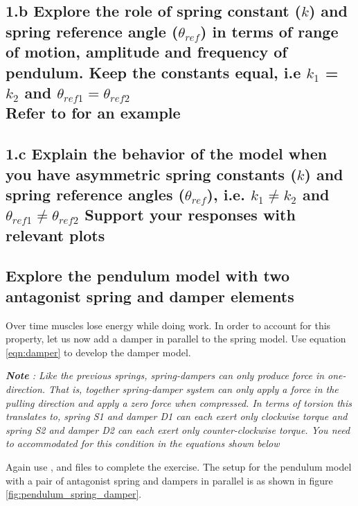 \documentclass{cmc}
\begin{document}
\subsection*{1.b Explore the role of spring constant ($k$) and spring
  reference angle ($\theta_{ref}$) in terms of range of motion,
  amplitude and frequency of pendulum. Keep the constants equal, i.e
  $k_1$  = $k_2$ and $\theta_{ref1} = \theta_{ref2}$
  \\ Refer to  for an example}


\subsection*{1.c Explain the behavior of the model when you have
  asymmetric spring constants ($k$) and spring reference angles
  ($\theta_{ref}$), i.e. $k_1 \neq k_2$ and $\theta_{ref1} \neq \theta_{ref2}$
  Support your responses with relevant plots}


\subsection*{Explore the pendulum model with two antagonist spring and damper elements}
Over time muscles lose energy while doing work. In order to account
for this property, let us now add a damper in parallel to the spring
model. Use equation \ref{eqn:damper} to develop the damper model.

\textit{\textbf{Note} : Like the previous springs, spring-dampers can
  only produce force in one-direction.  That is, together
  spring-damper system can only apply a force in the pulling direction
  and apply a zero force when compressed.  In terms of torsion this
  translates to, spring S1 and damper D1 can each exert only
  clockwise torque and spring S2 and damper D2 can each exert only
  counter-clockwise torque. You need to accommodated for this condition
  in the equations shown below}

Again use ,  and
 files to complete the exercise. The
setup for the pendulum model with a pair of antagonist spring and
dampers in parallel is as shown in figure
\ref{fig:pendulum_spring_damper}.
\end{document}
